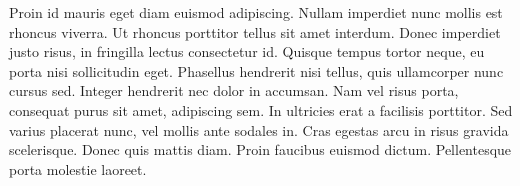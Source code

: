 Proin id mauris eget diam euismod adipiscing. Nullam imperdiet nunc mollis est rhoncus viverra. Ut rhoncus porttitor tellus sit amet interdum. Donec imperdiet justo risus, in fringilla lectus consectetur id. Quisque tempus tortor neque, eu porta nisi sollicitudin eget. Phasellus hendrerit nisi tellus, quis ullamcorper nunc cursus sed. Integer hendrerit nec dolor in accumsan. Nam vel risus porta, consequat purus sit amet, adipiscing sem. In ultricies erat a facilisis porttitor. Sed varius placerat nunc, vel mollis ante sodales in. Cras egestas arcu in risus gravida scelerisque. Donec quis mattis diam. Proin faucibus euismod dictum. Pellentesque porta molestie laoreet.
